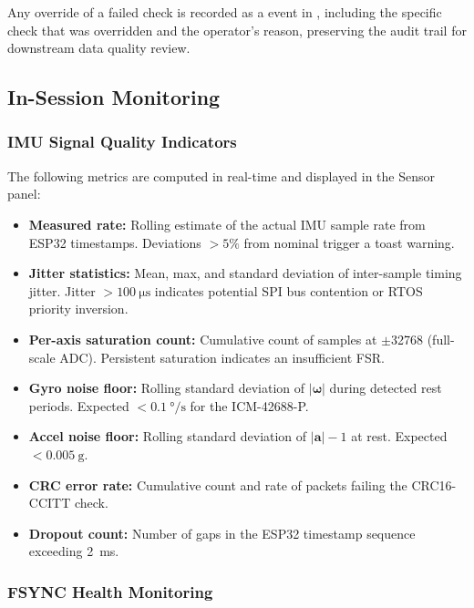 Any override of a failed check is recorded as a  event in , including the specific check that was overridden and the operator's reason, preserving the audit trail for downstream data quality review.


\subsection{In-Session Monitoring}

\subsubsection{IMU Signal Quality Indicators}

The following metrics are computed in real-time and displayed in the Sensor panel:

\begin{itemize}[nosep]
  \item \textbf{Measured rate:} Rolling estimate of the actual IMU sample rate from ESP32 timestamps. Deviations $> 5\%$ from nominal trigger a toast warning.
  \item \textbf{Jitter statistics:} Mean, max, and standard deviation of inter-sample timing jitter. Jitter $> \SI{100}{\micro\second}$ indicates potential SPI bus contention or RTOS priority inversion.
  \item \textbf{Per-axis saturation count:} Cumulative count of samples at $\pm$32768 (full-scale ADC). Persistent saturation indicates an insufficient FSR.
  \item \textbf{Gyro noise floor:} Rolling standard deviation of $|\boldsymbol{\omega}|$ during detected rest periods. Expected $< \SI{0.1}{\degree\per\second}$ for the ICM-42688-P.
  \item \textbf{Accel noise floor:} Rolling standard deviation of $|\mathbf{a}| - 1$ at rest. Expected $< \SI{0.005}{\g}$.
  \item \textbf{CRC error rate:} Cumulative count and rate of packets failing the CRC16-CCITT check.
  \item \textbf{Dropout count:} Number of gaps in the ESP32 timestamp sequence exceeding \SI{2}{\milli\second}.
\end{itemize}

\subsubsection{FSYNC Health Monitoring}

